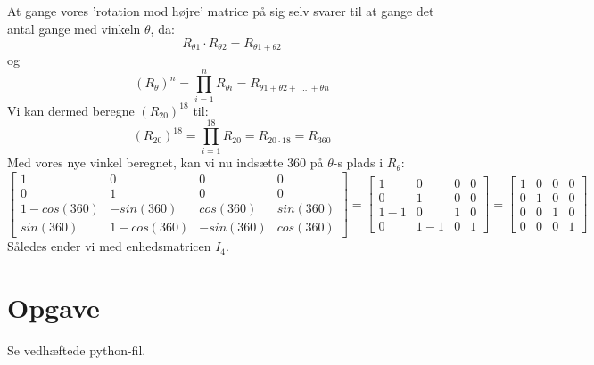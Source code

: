 \documentclass[a4paper,12pt]{article}
\begin{document}
\subsection{}
At gange vores 'rotation mod højre' matrice på sig selv svarer til at gange det antal gange med vinkeln $\theta$, da:
\[
R_{\theta 1} \cdot R_{\theta 2} = R_{\theta 1 + \theta 2}
\]
og
\[
(R_\theta)^{n} = \prod_{i=1}^{n} R_{\theta i} = R_{\theta 1 + \theta 2 + \ \dots \ + \theta n }
\]
Vi kan dermed beregne $(R_{20})^{18}$ til:
\[
(R_{20})^{18} = \prod_{i=1}^{18} R_{20} = R_{20 \cdot 18} = R_{360}
\]
Med vores nye vinkel beregnet, kan vi nu indsætte $360$ på $\theta $-s plads i $R_\theta$:
\[
\left[\begin{array}{cccc}
    1 & 0 & 0 & 0 \\
    0 & 1 & 0 & 0 \\
    1 - cos(360) & -sin(360) & cos(360) &  sin(360)\\
    sin(360) & 1 - cos(360) & -sin(360) & cos(360)
\end{array}\right]
=
\left[\begin{array}{cccc}
    1 & 0 & 0 & 0 \\
    0 & 1 & 0 & 0 \\
    1 - 1 & 0 & 1 &  0\\
    0 & 1 - 1 & 0 & 1
\end{array}\right]
=
\left[\begin{array}{cccc}
    1 & 0 & 0 & 0 \\
    0 & 1 & 0 & 0 \\
    0 & 0 & 1 & 0\\
    0 & 0 & 0 & 1
\end{array}\right]
\]
Således ender vi med enhedsmatricen $I_4$.

\section[Opgave]{Opgave}
Se vedhæftede python-fil.
\end{document}
